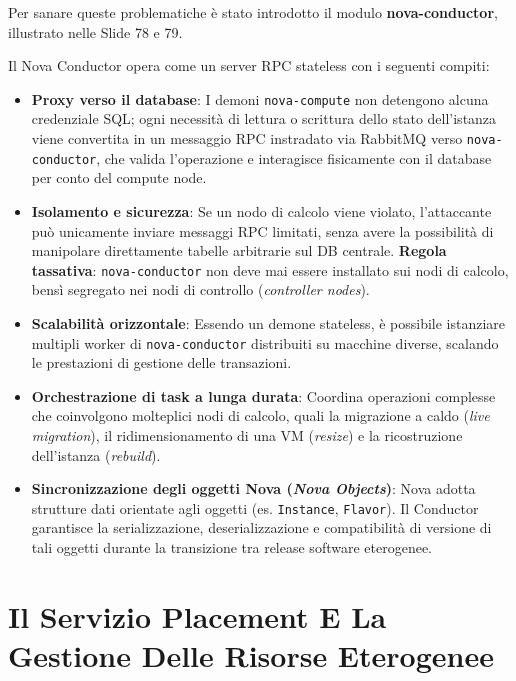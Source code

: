 \documentclass[11pt, a4paper]{article}
\begin{document}
Per sanare queste problematiche è stato introdotto il modulo \textbf{nova-conductor}, illustrato nelle Slide 78 e 79.


Il Nova Conductor opera come un server RPC stateless con i seguenti compiti:
\begin{itemize}
    \item \textbf{Proxy verso il database}: I demoni \texttt{nova-compute} non detengono alcuna credenziale SQL; ogni necessità di lettura o scrittura dello stato dell'istanza viene convertita in un messaggio RPC instradato via RabbitMQ verso \texttt{nova-conductor}, che valida l'operazione e interagisce fisicamente con il database per conto del compute node.
    \item \textbf{Isolamento e sicurezza}: Se un nodo di calcolo viene violato, l'attaccante può unicamente inviare messaggi RPC limitati, senza avere la possibilità di manipolare direttamente tabelle arbitrarie sul DB centrale. \textbf{Regola tassativa}: \texttt{nova-conductor} non deve mai essere installato sui nodi di calcolo, bensì segregato nei nodi di controllo (\emph{controller nodes}).
    \item \textbf{Scalabilità orizzontale}: Essendo un demone stateless, è possibile istanziare multipli worker di \texttt{nova-conductor} distribuiti su macchine diverse, scalando le prestazioni di gestione delle transazioni.
    \item \textbf{Orchestrazione di task a lunga durata}: Coordina operazioni complesse che coinvolgono molteplici nodi di calcolo, quali la migrazione a caldo (\emph{live migration}), il ridimensionamento di una VM (\emph{resize}) e la ricostruzione dell'istanza (\emph{rebuild}).
    \item \textbf{Sincronizzazione degli oggetti Nova (\emph{Nova Objects})}: Nova adotta strutture dati orientate agli oggetti (es. \texttt{Instance}, \texttt{Flavor}). Il Conductor garantisce la serializzazione, deserializzazione e compatibilità di versione di tali oggetti durante la transizione tra release software eterogenee.
\end{itemize}

\newpage

\section{Il Servizio Placement E La Gestione Delle Risorse Eterogenee}
\end{document}
